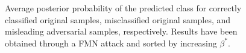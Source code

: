 \begin{figure}[H]
    \caption{Average posterior probability of the predicted class for 
    correctly classified original samples, misclassified original samples, and 
    misleading adversarial samples, respectively. Results have been obtained through a FMN attack 
    and sorted by increasing $\beta^{*}$.}
    \label{fig:appendix_adversarial_distribution_fmn}
\end{figure}


 \cleardoublepage

